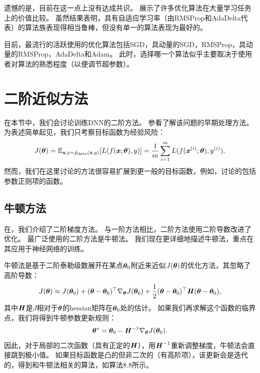 遗憾的是，目前在这一点上没有达成共识。
\cite{Schaul2014_unittests}展示了许多优化算法在大量学习任务上的价值比较。
虽然结果表明，具有自适应学习率（由RMSProp和AdaDelta代表）的算法族表现得相当鲁棒，但没有单一的算法表现为最好的。

目前，最流行的活跃使用的优化算法包括SGD，具动量的SGD，RMSProp，具动量的RMSProp，AdaDelta和Adam。
此时，选择哪一个算法似乎主要取决于使用者对算法的熟悉程度（以便调节超参数）。

\section{二阶近似方法}
\label{sec:approximate_second_order_methods}
在本节中，我们会讨论训练\gls{DNN}的二阶方法。
参看\cite{lecun1998mnist}了解该问题的早期处理方法。
为表述简单起见，我们只考察目标函数为经验风险：
\begin{equation}
    J(\boldsymbol{\theta}) = \mathbb{E}_{\mathbf{x}, \mathrm{y} \sim \hat{p}_{\text{data}}(\boldsymbol{\mathit{x}},y) } [ L(f(\boldsymbol{\mathit{x}}; \boldsymbol{\theta}), y) ] =
\frac{1}{m} \sum_{i=1}^m L(f(\boldsymbol{\mathit{x}}^{(i)}; \boldsymbol{\theta}), y^{(i)}).
\end{equation}
然而，我们在这里讨论的方法很容易扩展到更一般的目标函数，例如，讨论的包括参数正则项的函数。


\subsection{牛顿方法}
\label{sec:newton_method}
在，我们介绍了二阶梯度方法。
与一阶方法相比，二阶方法使用二阶导数改进了优化。
最广泛使用的二阶方法是牛顿法。
我们现在更详细地描述牛顿法，重点在其应用于神经网络的训练。

牛顿法是基于二阶泰勒级数展开在某点$\boldsymbol{\theta}_0$附近来近似$J(\boldsymbol{\theta})$的优化方法，其忽略了高阶导数：
\begin{equation}
    J(\boldsymbol{\theta}) \approx J(\boldsymbol{\theta}_0) + (\boldsymbol{\theta} - \boldsymbol{\theta}_0)^\top \nabla_{\boldsymbol{\theta}}   
    J(\boldsymbol{\theta}_0) + \frac{1}{2} (\boldsymbol{\theta} - \boldsymbol{\theta}_0)^\top \boldsymbol{\mathit{H}}(\boldsymbol{\theta} - \boldsymbol{\theta}_0),
\end{equation}
其中$\boldsymbol{\mathit{H}}$是$J$相对于$\boldsymbol{\theta}$的\gls{hessian}矩阵在$\boldsymbol{\theta}_0$处的估计。
如果我们再求解这个函数的临界点，我们将得到牛顿参数更新规则：
\begin{equation}
\label{eq:8.27}
    \boldsymbol{\theta}^* = \boldsymbol{\theta}_0 - \boldsymbol{\mathit{H}}^{-1}\nabla_{\boldsymbol{\theta}} J(\boldsymbol{\theta}_0).
\end{equation}
因此，对于局部的二次函数（具有正定的$\boldsymbol{\mathit{H}}$），用$\boldsymbol{\mathit{H}}^{-1}$重新调整梯度，牛顿法会直接跳到极小值。
如果目标函数是凸的但非二次的（有高阶项），该更新会是迭代的，得到和牛顿法相关的算法，如算法8.8所示。


